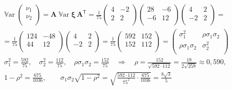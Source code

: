 \documentclass[12pt]{spbstu-task}
\begin{document}
\begin{gather*}
  \operatorname{\mathbb{V}ar}\begin{pmatrix}
    \nu_1 \\
    \nu_2 \\
  \end{pmatrix} = \mathbf{A}\operatorname{\mathbb{V}ar}\boldsymbol{\xi}\,\mathbf{A}^{\mathsf{T}} =
  \frac{1}{75}\begin{pmatrix}
    4 & -2 \\
    2 & 2 \\
  \end{pmatrix}\begin{pmatrix}
    28 & -6 \\
    -6 & 12 \\
  \end{pmatrix}\begin{pmatrix}
    4 & 2 \\
    -2 & 2 \\
  \end{pmatrix} = \\ =
  \frac{1}{75}\begin{pmatrix}
    124 & -48 \\
    44 & 12 \\
  \end{pmatrix}\begin{pmatrix}
    4 & 2 \\
    -2 & 2 \\
  \end{pmatrix} =
  \frac{1}{75}\begin{pmatrix}
    592 & 152 \\
    152 & 112 \\
  \end{pmatrix} = \begin{pmatrix}
    \sigma_1^2 & \rho\sigma_1\sigma_2 \\
    \rho\sigma_1\sigma_2 & \sigma_2^2 \\
  \end{pmatrix}
\end{gather*}
\begin{gather*}
  \sigma_1^2 = \frac{592}{75},\quad\sigma_2^2 = \frac{112}{75},\quad\rho\sigma_1\sigma_2 = \frac{152}{75}
  \quad\Rightarrow\quad
  \rho = \frac{152}{\sqrt{592\cdot 112}} = \frac{19}{2\sqrt{259}} \approx 0{,}590, \\
  1 - \rho^2 = \frac{675}{1036},\qquad
  \sigma_1\sigma_2\sqrt{1 - \rho^2} = \sqrt{\frac{592\cdot 112}{75^2}\cdot\frac{675}{1036}} = \frac{8\sqrt{3}}{5}
\end{gather*}
\end{document}

